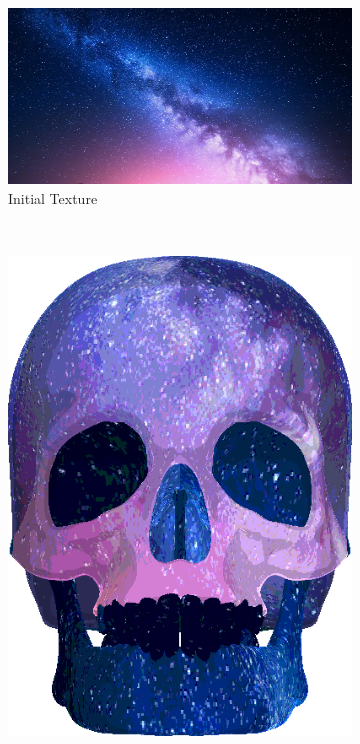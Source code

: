 \begin{figure}[h]
    \centering
        \begin{subfigure}[b]{0.4\textwidth}
        \includegraphics[width=\textwidth]{img/textures/space.png}
        \caption{Initial Texture}
        \label{fig:Space}
    \end{subfigure}
~
\hspace{24pt}
~
    \centering
    \begin{subfigure}[b]{0.16\textwidth}
        \includegraphics[width=\textwidth]{img/Combined/SpaceSkullNoContour.png}

\end{subfigure}
\end{figure}
